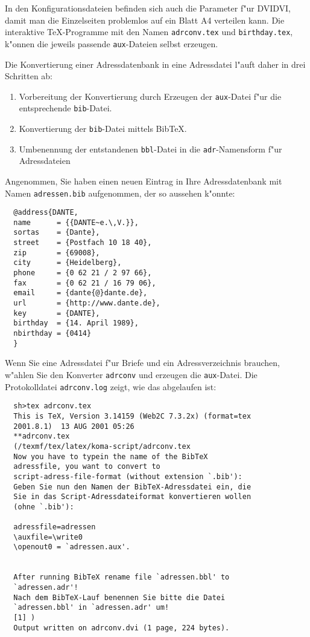 \documentclass{article}
\newcommand*{\File}[1]{\texttt{#1}}
\begin{document}
In den Konfigurationsdateien befinden sich auch die Parameter f"ur 
DVIDVI, damit man die Einzelseiten problemlos auf ein Blatt A4 
verteilen kann. Die interaktive \TeX-Programme mit den
Namen \File{adrconv.tex} und \File{birthday.tex},
k"onnen die jeweils passende \File{aux}-Dateien selbst erzeugen.

Die Konvertierung einer Adressdatenbank in eine Adressdatei l"auft
daher in drei Schritten ab:

\begin{enumerate}
        \item Vorbereitung der Konvertierung durch Erzeugen der 
        \File{aux}-Datei f"ur die entsprechende \File{bib}-Datei.
        
        \item Konvertierung der \File{bib}-Datei mittels Bib\TeX.
        
        \item Umbenennung der entstandenen \File{bbl}-Datei in die 
        \File{adr}-Namensform f"ur Adressdateien
\end{enumerate}


Angenommen, Sie haben einen neuen Eintrag in Ihre 
Adressdatenbank mit Namen \File{adressen.bib} aufgenommen,
der so aussehen k"onnte:

\begin{small}        
\begin{verbatim}
  @address{DANTE,
  name      = {{DANTE~e.\,V.}},
  sortas    = {Dante},
  street    = {Postfach 10 18 40},
  zip       = {69008},
  city      = {Heidelberg},
  phone     = {0 62 21 / 2 97 66},
  fax       = {0 62 21 / 16 79 06},
  email     = {dante{@}dante.de},
  url       = {http://www.dante.de},
  key       = {DANTE},
  birthday  = {14. April 1989},
  nbirthday = {0414}
  }
\end{verbatim}
\end{small}

Wenn Sie eine Adressdatei f"ur Briefe und ein 
Adressverzeichnis
brauchen, w"ahlen Sie den Konverter \File{adrconv} und erzeugen
die \File{aux}-Datei. Die Protokolldatei \File{adrconv.log}
zeigt, wie das abgelaufen ist:

\begin{small}        
\begin{verbatim}
  sh>tex adrconv.tex             
  This is TeX, Version 3.14159 (Web2C 7.3.2x) (format=tex 
  2001.8.1)  13 AUG 2001 05:26
  **adrconv.tex
  (/texmf/tex/latex/koma-script/adrconv.tex
  Now you have to typein the name of the BibTeX 
  adressfile, you want to convert to 
  script-adress-file-format (without extension `.bib'):
  Geben Sie nun den Namen der BibTeX-Adressdatei ein, die 
  Sie in das Script-Adressdateiformat konvertieren wollen 
  (ohne `.bib'):

  adressfile=adressen
  \auxfile=\write0
  \openout0 = `adressen.aux'.


  After running BibTeX rename file `adressen.bbl' to 
  `adressen.adr'!
  Nach dem BibTeX-Lauf benennen Sie bitte die Datei 
  `adressen.bbl' in `adressen.adr' um!
  [1] )
  Output written on adrconv.dvi (1 page, 224 bytes).
\end{verbatim}
\end{small}
\end{document}
